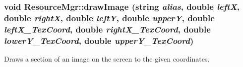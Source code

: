 \hypertarget{class_resource_mgr_1af447bb573344a7b20e3b5f6ffd1fe2}{
\subsubsection[{drawImage}]{\setlength{\rightskip}{0pt plus 5cm}void ResourceMgr::drawImage (string {\em alias}, \/  double {\em leftX}, \/  double {\em rightX}, \/  double {\em leftY}, \/  double {\em upperY}, \/  double {\em leftX\_\-TexCoord}, \/  double {\em rightX\_\-TexCoord}, \/  double {\em lowerY\_\-TexCoord}, \/  double {\em upperY\_\-TexCoord})}}
\label{class_resource_mgr_1af447bb573344a7b20e3b5f6ffd1fe2}


Draws a section of an image on the screen to the given coordinates. 

